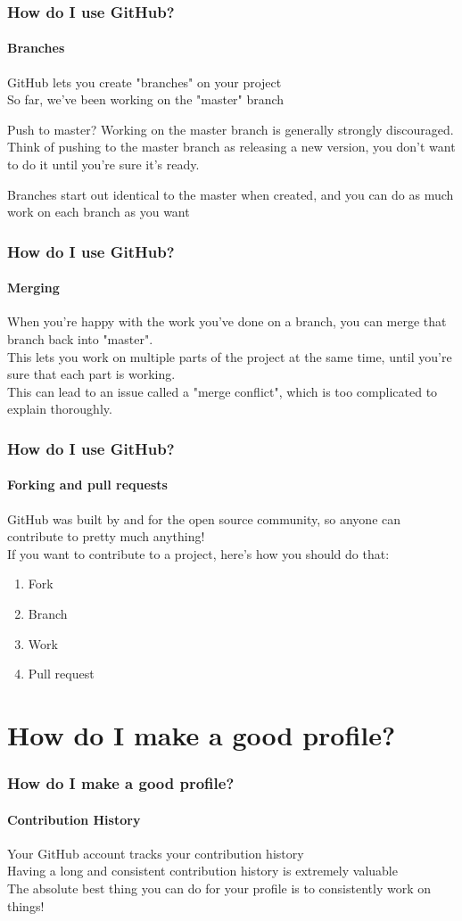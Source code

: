 \documentclass{beamer}
\begin{document}
\begin{frame}
  \frametitle{How do I use GitHub?}
  \framesubtitle{Branches}
  GitHub lets you create "branches" on your project\\\pause
  So far, we've been working on the "master" branch\\
  \begin{alertblock}{Push to master?}
    Working on the master branch is generally strongly discouraged. Think of pushing to the master branch as releasing a new version, you don't want to do it until you're sure it's ready.
  \end{alertblock}\pause
  Branches start out identical to the master when created, and you can do as much work on each branch as you want
\end{frame}

\begin{frame}
  \frametitle{How do I use GitHub?}
  \framesubtitle{Merging}
  When you're happy with the work you've done on a branch, you can merge that branch back into "master".\\\pause
  This lets you work on multiple parts of the project at the same time, until you're sure that each part is working.\\\pause
  This can lead to an issue called a "merge conflict", which is too complicated to explain thoroughly.
\end{frame}

\begin{frame}
  \frametitle{How do I use GitHub?}
  \framesubtitle{Forking and pull requests}
  GitHub was built by and for the open source community, so anyone can contribute to pretty much anything!\\\pause
  If you want to contribute to a project, here's how you should do that:
  \begin{enumerate}[<+->]
    \item Fork
    \item Branch
    \item Work
    \item Pull request
  \end{enumerate}
\end{frame}

\section{How do I make a good profile?}
\begin{frame}
  \frametitle{How do I make a good profile?}
  \framesubtitle{Contribution History}
  Your GitHub account tracks your contribution history\\\pause
  Having a long and consistent contribution history is extremely valuable\\\pause
  The absolute best thing you can do for your profile is to consistently work on things!
\end{frame}
\end{document}
